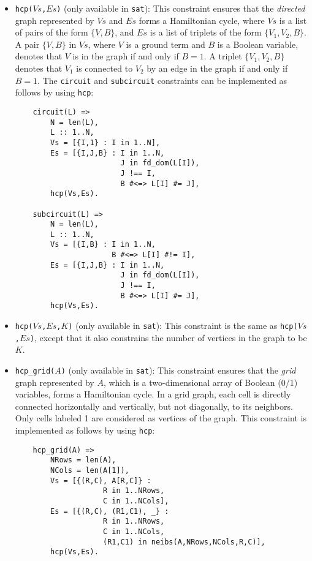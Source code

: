 \begin{itemize}
\item \texttt{hcp($Vs$,$Es$)} (only available in \texttt{sat}): This constraint ensures that the \textit{directed} graph represented by $Vs$ and $Es$ forms a Hamiltonian cycle, where $Vs$ is a list of pairs of the form $\{V,B\}$, and $Es$ is a list of triplets of the form $\{V_1,V_2,B\}$. A pair $\{V,B\}$ in $Vs$, where $V$ is a ground term and $B$ is a Boolean variable, denotes that $V$ is in the graph if and only if $B = 1$. A triplet $\{V_1,V_2,B\}$ denotes that $V_1$ is connected to $V_2$  by an edge in the graph if and only if $B = 1$. The \texttt{circuit} and \texttt{subcircuit} constraints can be implemented as follows by using \texttt{hcp}:
\begin{verbatim}
    circuit(L) =>
        N = len(L),
        L :: 1..N,
        Vs = [{I,1} : I in 1..N],
        Es = [{I,J,B} : I in 1..N, 
                        J in fd_dom(L[I]), 
                        J !== I, 
                        B #<=> L[I] #= J],
        hcp(Vs,Es).

    subcircuit(L) =>
        N = len(L),
        L :: 1..N,
        Vs = [{I,B} : I in 1..N, 
                      B #<=> L[I] #!= I],
        Es = [{I,J,B} : I in 1..N, 
                        J in fd_dom(L[I]), 
                        J !== I, 
                        B #<=> L[I] #= J],
        hcp(Vs,Es).
\end{verbatim}

\item \texttt{hcp($Vs$,$Es$,$K$)} (only available in \texttt{sat}):  This constraint is the same as \texttt{hcp($Vs$,$Es$)}, except that it also constrains the number of vertices in the graph to be $K$. 

\item \texttt{hcp\_grid($A$)} (only available in \texttt{sat}):  This constraint ensures that the \textit{grid} graph represented by $A$, which is a two-dimensional array of Boolean (0/1) variables, forms a Hamiltonian cycle. In a grid graph, each cell is directly connected horizontally and vertically, but not diagonally, to its neighbors. Only cells labeled 1 are considered as vertices of the graph. This constraint is implemented as follows by using \texttt{hcp}:
\begin{verbatim}
    hcp_grid(A) =>
        NRows = len(A),
        NCols = len(A[1]),
        Vs = [{(R,C), A[R,C]} : 
                    R in 1..NRows, 
                    C in 1..NCols],
        Es = [{(R,C), (R1,C1), _} : 
                    R in 1..NRows, 
                    C in 1..NCols,
                    (R1,C1) in neibs(A,NRows,NCols,R,C)],
        hcp(Vs,Es).


\end{verbatim}
\end{itemize}
